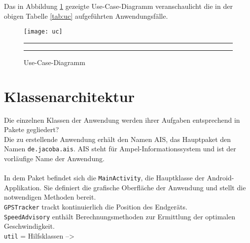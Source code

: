 Das in Abbildung \ref{fig:uc} gezeigte Use-Case-Diagramm veranschaulicht die in der obigen Tabelle \ref{tab:uc} aufgeführten Anwendungsfälle.  
\begin{figure}[H]  
    \centering  
    \texttt{[image: uc]} 
    \rule{35em}{0.5pt}
    \caption{Use-Case-Diagramm}
      \rule{35em}{0.5pt}
    \label{fig:uc}
\end{figure}
\section{Klassenarchitektur}
Die einzelnen Klassen der Anwendung werden ihrer Aufgaben entsprechend in Pakete gegliedert?\\
Die zu erstellende Anwendung erhält den Namen AIS, das Hauptpaket den Namen \texttt{de.jacoba.ais}. AIS steht für Ampel-Informationssystem und ist der vorläufige Name der Anwendung. \\\\
In dem Paket befindet sich die \texttt{MainActivity}, die Hauptklasse der Android-Applikation. Sie definiert die grafische Oberfläche der Anwendung und stellt die notwendigen Methoden bereit. \\
\texttt{GPSTracker} trackt kontinuierlich die Position des Endgeräts.\\
\texttt{SpeedAdvisory} enthält Berechnungsmethoden zur Ermittlung der optimalen Geschwindigkeit.\\
 \texttt{util} = Hilfsklassen -->
